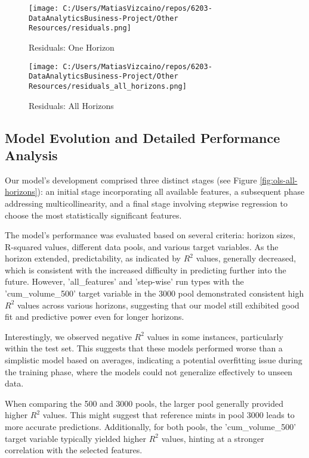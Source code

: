 \documentclass{article}
\begin{document}
\begin{figure}[htbp]
  \begin{minipage}{0.5\textwidth}
  \centering
  \texttt{[image: C:/Users/MatiasVizcaino/repos/6203-DataAnalyticsBusiness-Project/Other Resources/residuals.png]}
  \caption{Residuals: One Horizon}
  \label{fig:residual-one-horizon}
  \end{minipage}
  \begin{minipage}{0.45\textwidth}
  \centering
  \texttt{[image: C:/Users/MatiasVizcaino/repos/6203-DataAnalyticsBusiness-Project/Other Resources/residuals\_all\_horizons.png]}
  \caption{Residuals: All Horizons}
  \label{fig:residual-all-horizons}
  \end{minipage}
  \end{figure}

\subsection{Model Evolution and Detailed Performance Analysis}

Our model's development comprised three distinct stages (see Figure \ref{fig:ols-all-horizons}): an initial stage incorporating all available features, a subsequent phase addressing multicollinearity, and a final stage involving stepwise regression to choose the most statistically significant features.

The model's performance was evaluated based on several criteria: horizon sizes, R-squared values, different data pools, and various target variables. As the horizon extended, predictability, as indicated by \( R^2 \) values, generally decreased, which is consistent with the increased difficulty in predicting further into the future. However, 'all\_features' and 'step-wise' run types with the 'cum\_volume\_500' target variable in the 3000 pool demonstrated consistent high \( R^2 \) values across various horizons, suggesting that our model still exhibited good fit and predictive power even for longer horizons.

Interestingly, we observed negative \( R^2 \) values in some instances, particularly within the test set. This suggests that these models performed worse than a simplistic model based on averages, indicating a potential overfitting issue during the training phase, where the models could not generalize effectively to unseen data.

When comparing the 500 and 3000 pools, the larger pool generally provided higher \( R^2 \) values. This might suggest that reference mints in pool 3000 leads to more accurate predictions. Additionally, for both pools, the 'cum\_volume\_500' target variable typically yielded higher \( R^2 \) values, hinting at a stronger correlation with the selected features.
\end{document}
